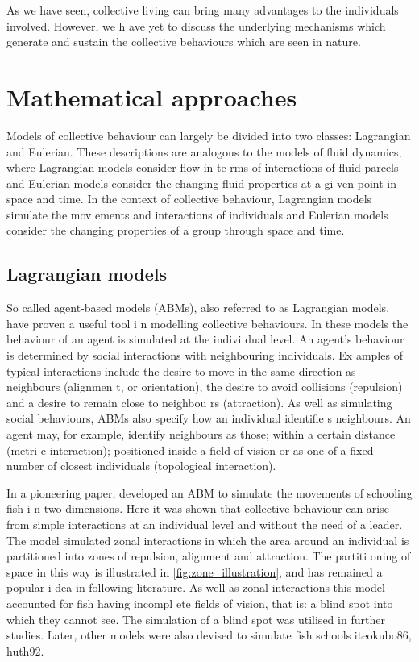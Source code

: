 As we have seen, collective living can bring many advantages to the individuals involved. However, we h
ave yet to discuss the underlying mechanisms which generate and sustain the collective behaviours which
 are seen in nature.

\section{Mathematical approaches}
\label{sec:models}

Models of collective behaviour can largely be divided into two classes: Lagrangian and Eulerian. These 
descriptions are analogous to the models of fluid dynamics, where Lagrangian models consider flow in te
rms of interactions of fluid parcels and Eulerian models consider the changing fluid properties at a gi
ven point in space and time. In the context of collective behaviour, Lagrangian models simulate the mov
ements and interactions of individuals and Eulerian models consider the changing properties of a group 
through space and time.

\subsection{Lagrangian models}
\label{ssec:lagrangian_models}

So called agent-based models (ABMs), also referred to as Lagrangian models, have proven a useful tool i
n modelling collective behaviours. In these models the behaviour of an agent is simulated at the indivi
dual level. An agent's behaviour is determined by social interactions with neighbouring individuals. Ex
amples of typical interactions include the desire to move in the same direction as neighbours (alignmen
t, or orientation), the desire to avoid collisions (repulsion) and a desire to remain close to neighbou
rs (attraction). As well as simulating social behaviours, ABMs also specify how an individual identifie
s neighbours. An agent may, for example, identify neighbours as those; within a certain distance (metri
c interaction); positioned inside a field of vision or as one of a fixed number of closest individuals 
(topological interaction).

In a pioneering paper, \textcite{aoki82} developed an ABM to simulate the movements of schooling fish i
n two-dimensions. Here it was shown that collective behaviour can arise from simple interactions at an 
individual level and without the need of a leader. The model simulated zonal interactions in which the 
area around an individual is partitioned into zones of repulsion, alignment and attraction. The partiti
oning of space in this way is illustrated in \cref{fig:zone_illustration}, and has remained a popular i
dea in following literature. As well as zonal interactions this model accounted for fish having incompl
ete fields of vision, that is: a blind spot into which they cannot see. The simulation of a blind spot 
was utilised in further studies. Later, other models were also devised to simulate fish schools \parenc
ite{okubo86, huth92}.

